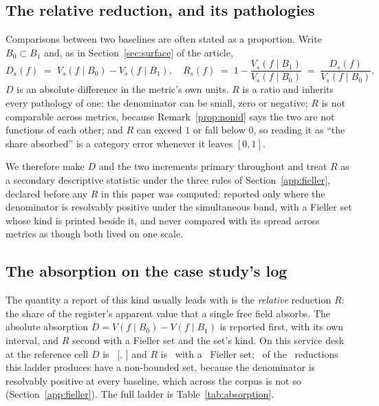 \subsection{The relative reduction, and its pathologies}
\label{sec:reduction}

Comparisons between two baselines are often stated as a proportion. Write
$B_0 \subset B_1$ and, as in Section~\ref{sec:surface} of the article,
\begin{equation*}
D_s(f) \;=\; V_s(f \mid B_0) - V_s(f \mid B_1),
\quad
R_s(f) \;=\; 1 - \frac{V_s(f \mid B_1)}{V_s(f \mid B_0)}
\;=\; \frac{D_s(f)}{V_s(f \mid B_0)} .
\end{equation*}
$D$ is an absolute difference in the metric's own units. $R$ is a ratio and
inherits every pathology of one: the denominator can be small, zero or
negative; $R$ is not comparable across metrics, because
Remark~\ref{prop:nonid} says the two are not functions of each other; and
$R$ can exceed $1$ or fall below $0$, so reading it as ``the share absorbed''
is a category error whenever it leaves $[0,1]$.

We therefore make $D$ and the two increments primary throughout and treat $R$
as a secondary descriptive statistic under the three rules of
Section~\ref{app:fieller}, declared before any $R$ in this paper was
computed: reported only where the denominator is resolvably positive under
the simultaneous band, with a Fieller set whose kind is printed beside it,
and never compared with its spread across metrics as though both lived on
one scale.

\subsection{The absorption on the case study's log}

The quantity a report of this kind usually leads with is the \emph{relative}
reduction $R$: the share of the register's apparent value that a single free
field absorbs. The absolute absorption $D = V(f \mid B_0) - V(f \mid B_1)$ is
reported first, with its own interval, and $R$ second with a Fieller set and
the set's kind. On this service desk at the reference cell $D$ is \Dabs\ [\DabsLo,
\DabsHi] and $R$ is \Rref\ with a \RrefKind\ Fieller set; \nFiellerUnboundedCase\
of the \nFiellerCase\ reductions this ladder produces have a non-bounded set,
because the denominator is resolvably positive at every baseline, which across the
corpus is not so (Section~\ref{app:fieller}). The full ladder is
Table~\ref{tab:absorption}.

